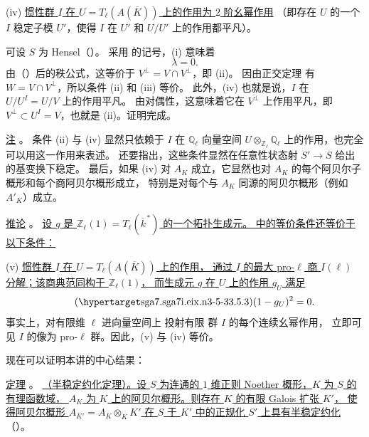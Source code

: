 \noindent
(iv) \underline{惯性群 $I$ 在 $U=T_\ell(A(\overline K))$ 上的作用为 $2$ 阶幺幂作用}
（即存在 $U$ 的一个 $I$ 稳定子模 $U'$，使得 $I$ 在 $U'$ 和 $U/U'$ 上的作用都平凡）。

可设 $S$ 为 Hensel（）。
采用  的记号，(i) 意味着
\[
 \lambda=0.
\]
由（）后的秩公式，这等价于
$V^\perp=V\cap V^\perp$，即 (ii)。
因由正交定理  有 $W=V\cap V^\perp$，所以条件 (ii) 和 (iii) 等价。
此外，(iv) 也就是说，$I$ 在 $U/U^I=U/V$ 上的作用平凡。
由对偶性，这意味着它在 $V^\perp$ 上作用平凡，即 $V^\perp\subset U^I=V$，也就是 (ii)。证明完成。

\medskip
\noindent
\underline{注} 。
条件 (ii) 与 (iv) 显然只依赖于 $I$ 在 $\mathbb Q_\ell$ 向量空间
$U\otimes_{\mathbb Z_\ell}\mathbb Q_\ell$ 上的作用，也完全可以用这一作用来表述。
还要指出，这些条件显然在任意性状态射 $S'\longrightarrow S$ 给出的基变换下稳定。
最后，如果 (iv) 对 $A_K$ 成立，它显然也对 $A_K$ 的每个阿贝尔子概形和每个商阿贝尔概形成立，
特别是对每个与 $A_K$ 同源的阿贝尔概形（例如 $A'_K$）成立。

\medskip
\noindent
\underline{推论} 。
\underline{设 $g$ 是 $\mathbb Z_\ell(1)=T_\ell(\overline k^{\,*})$ 的一个拓扑生成元。
 中的等价条件还等价于以下条件：}

\smallskip
\noindent
(v) \underline{惯性群 $I$ 在 $U=T_\ell(A(\overline K))$ 上的作用，
通过 $I$ 的最大 pro-$\ell$ 商 $I(\ell)$ 分解；该商典范同构于 $\mathbb Z_\ell(1)$，
而生成元 $g$ 在 $U$ 上的作用 $g_U$ 满足}
\begin{equation}\tag{\SGARefTarget{sga7.sga7i.eix.n3-5-3}{3.5.3}}
 (1-g_U)^2=0.
\end{equation}
事实上，对有限维 $\ell$ 进向量空间上 投射有限 群 $I$ 的每个连续幺幂作用，
立即可见 $I$ 的像为 pro-$\ell$ 群。因此，(v) 与 (iv) 等价。

现在可以证明本讲的中心结果：

\medskip
\noindent
\underline{定理} 。
\underline{（半稳定约化定理）。设 $S$ 为连通的 $1$ 维正则 Noether 概形，$K$ 为 $S$ 的有理函数域，
$A_K$ 为 $K$ 上的阿贝尔概形。则存在 $K$ 的有限 Galois 扩张 $K'$，
使得阿贝尔概形 $A_{K'}=A_K\otimes_KK'$ 在 $S$ 于 $K'$ 中的正规化 $S'$ 上具有半稳定约化}
（）。

